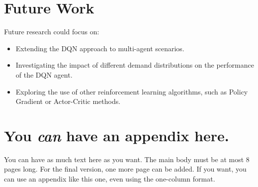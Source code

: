 \documentclass[nohyperref]{article}
\theoremstyle{plain}
\theoremstyle{definition}
\theoremstyle{remark}
\begin{document}
    \section{Future Work}
    Future research could focus on:
    \begin{itemize}
        \item Extending the DQN approach to multi-agent scenarios.
        \item Investigating the impact of different demand distributions on the performance of the DQN agent.
        \item Exploring the use of other reinforcement learning algorithms, such as Policy Gradient or Actor-Critic methods.
    \end{itemize}
    


\nocite{langley00}





\newpage
\appendix
\onecolumn
\section{You \emph{can} have an appendix here.}

You can have as much text here as you want. The main body must be at most $8$ pages long.
For the final version, one more page can be added.
If you want, you can use an appendix like this one, even using the one-column format.
\end{document}
